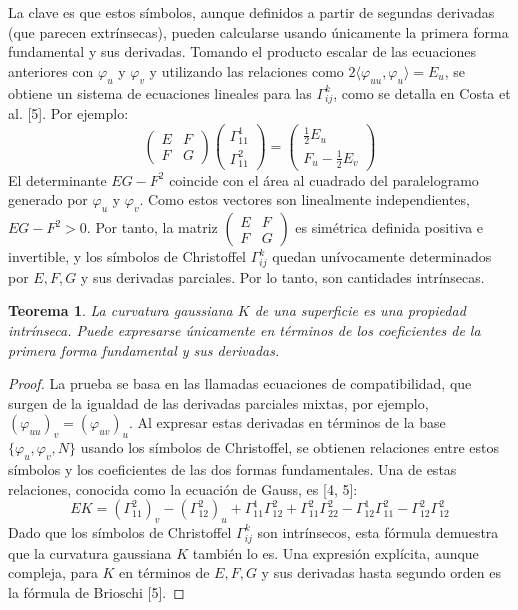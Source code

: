 \documentclass[12pt, a4paper]{report}
\theoremstyle{miestilo}
\newtheorem{teorema}{Teorema}[chapter]
\theoremstyle{midefinicion}
\begin{document}
La clave es que estos símbolos, aunque definidos a partir de segundas derivadas (que parecen extrínsecas), pueden calcularse usando únicamente la primera forma fundamental y sus derivadas. Tomando el producto escalar de las ecuaciones anteriores con $\varphi_u$ y $\varphi_v$ y utilizando las relaciones como $2\langle \varphi_{uu}, \varphi_u \rangle = E_u$, se obtiene un sistema de ecuaciones lineales para las $\Gamma_{ij}^k$, como se detalla en Costa et al. [5]. Por ejemplo:
$$ \begin{pmatrix} E & F \\ F & G \end{pmatrix} \begin{pmatrix} \Gamma_{11}^1 \\ \Gamma_{11}^2 \end{pmatrix} = \begin{pmatrix} \frac{1}{2}E_u \\ F_u - \frac{1}{2}E_v \end{pmatrix} $$
El determinante $EG - F^2$ coincide con el área al cuadrado del paralelogramo generado por $\varphi_u$ y $\varphi_v$. Como estos vectores son linealmente independientes, $EG - F^2 > 0$. Por tanto, la matriz $\begin{pmatrix} E & F \\ F & G \end{pmatrix}$ es simétrica definida positiva e invertible, y los símbolos de Christoffel $\Gamma_{ij}^k$ quedan unívocamente determinados por $E, F, G$ y sus derivadas parciales. Por lo tanto, son cantidades intrínsecas.

\begin{teorema}
La curvatura gaussiana $K$ de una superficie es una propiedad intrínseca. Puede expresarse únicamente en términos de los coeficientes de la primera forma fundamental y sus derivadas.
\end{teorema}

\begin{proof}
La prueba se basa en las llamadas ecuaciones de compatibilidad, que surgen de la igualdad de las derivadas parciales mixtas, por ejemplo, $(\varphi_{uu})_v = (\varphi_{uv})_u$. Al expresar estas derivadas en términos de la base $\{\varphi_u, \varphi_v, N\}$ usando los símbolos de Christoffel, se obtienen relaciones entre estos símbolos y los coeficientes de las dos formas fundamentales. Una de estas relaciones, conocida como la ecuación de Gauss, es [4, 5]:
$$ E K = (\Gamma_{11}^2)_v - (\Gamma_{12}^2)_u + \Gamma_{11}^1 \Gamma_{12}^2 + \Gamma_{11}^2 \Gamma_{22}^2 - \Gamma_{12}^1 \Gamma_{11}^2 - \Gamma_{12}^2 \Gamma_{12}^2 $$
Dado que los símbolos de Christoffel $\Gamma_{ij}^k$ son intrínsecos, esta fórmula demuestra que la curvatura gaussiana $K$ también lo es. Una expresión explícita, aunque compleja, para $K$ en términos de $E, F, G$ y sus derivadas hasta segundo orden es la fórmula de Brioschi [5].
\end{proof}
\end{document}
